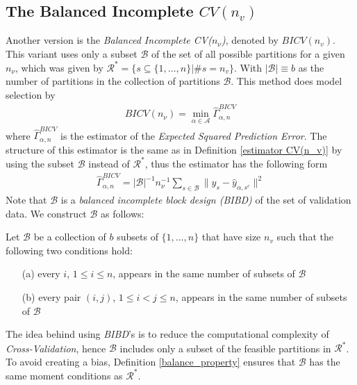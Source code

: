 \documentclass[Research_Module_ES.tex]{subfiles}
\begin{document}
\subsection{The Balanced Incomplete $CV(n_v)$}
Another version is the \textit{Balanced Incomplete CV($n_\nu$)}, denoted by $BICV(n_v)$. This variant uses only a subset $\mathcal{B}$ of the set of all possible partitions for a given $n_\nu$, which was given by $\mathcal{R}^\ast= \{s\subseteq\{1,\dots,n\}|\# s=n_v\}$. With $|\mathcal{B}|\equiv b$ as the number of partitions in the collection of partitions $\mathcal{B}$. This method does model selection by 
\begin{align*}
	BICV(n_\nu)=\min_{\alpha\in\mathcal{A}}\hat{\Gamma}_{\alpha,n}^{BICV}
\end{align*}
where $\hat{\Gamma}_{\alpha,n}^{BICV}$ is the estimator of the \textit{Expected Squared Prediction Error}. The structure of this estimator is the same as in Definition \ref{estimator CV(n_v)} by using the subset $\mathcal{B}$ instead of $\mathcal{R}^\ast$, thus the estimator has the following form
\begin{align*}
	\hat{\Gamma}_{\alpha,n}^{BICV}=|\mathcal{B}|^{-1}n_\nu^{-1}\sum_{s\in\mathcal{B}}\parallel y_s-\hat{y}_{\alpha,s^c}\parallel^2
\end{align*}
Note that $\mathcal{B}$ is a \textit{balanced incomplete block design (BIBD)} of the set of validation data. We construct $\mathcal{B}$ as follows: 
\begin{defi}
\label{balance_property}
Let $\mathcal{B}$ be a collection of $b$ subsets of $\{ 1,\dots,n\}$ that have size $n_v$ such that the following two conditions hold:
\begin{enumerate}
\item[(a)] every $i$, $1\le i \le n$, appears in the same number of subsets of $\mathcal{B}$
\item[(b)] every pair $(i,j)$, $1\le i < j \le n$, appears in the same number of subsets of $\mathcal{B}$
\end{enumerate}
\end{defi}
The idea behind using \textit{BIBD}'s is to reduce the computational complexity of \textit{Cross-Validation}, hence $\mathcal{B}$ includes only a subset of the feasible partitions in $\mathcal{R}^\ast$. To avoid creating a bias, Definition \ref{balance_property} ensures that $\mathcal{B}$ has the same moment conditions as $\mathcal{R}^\ast$.
\end{document}
